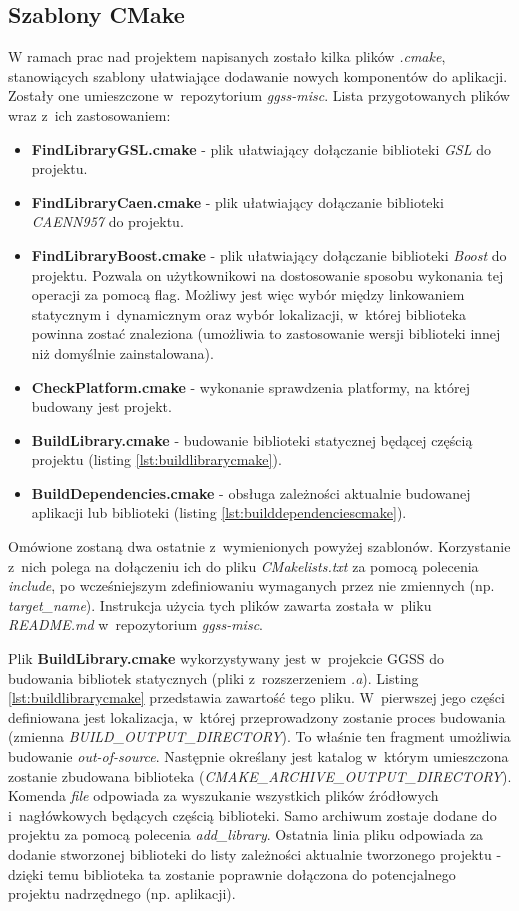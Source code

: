 \subsection{Szablony CMake}
W ramach prac nad projektem napisanych zostało kilka plików \textit{.cmake}, stanowiących szablony ułatwiające dodawanie nowych komponentów do aplikacji. Zostały one umieszczone w~repozytorium \textit{ggss-misc}. Lista przygotowanych plików wraz z~ich zastosowaniem:
\begin{itemize}
\item \textbf{FindLibraryGSL.cmake} - plik ułatwiający dołączanie biblioteki \textit{GSL} do projektu.
\item \textbf{FindLibraryCaen.cmake} - plik ułatwiający dołączanie biblioteki \textit{CAENN957} do projektu.
\item \textbf{FindLibraryBoost.cmake} -  plik ułatwiający dołączanie biblioteki \textit{Boost} do projektu. Pozwala on użytkownikowi na dostosowanie sposobu wykonania tej operacji za pomocą flag. Możliwy jest więc wybór między linkowaniem statycznym i~dynamicznym oraz wybór lokalizacji, w~której biblioteka powinna zostać znaleziona (umożliwia to zastosowanie wersji biblioteki innej niż domyślnie zainstalowana). 
\item \textbf{CheckPlatform.cmake} - wykonanie sprawdzenia platformy, na której budowany jest projekt.
\item \textbf{BuildLibrary.cmake} - budowanie biblioteki statycznej będącej częścią projektu (listing \ref{lst:buildlibrarycmake}).
\item \textbf{BuildDependencies.cmake} - obsługa zależności aktualnie budowanej aplikacji lub biblioteki (listing \ref{lst:builddependenciescmake}). 
\end{itemize}

Omówione zostaną dwa ostatnie z~wymienionych powyżej szablonów. Korzystanie z~nich polega na dołączeniu ich do pliku \textit{CMakelists.txt} za pomocą polecenia \textit{include}, po wcześniejszym zdefiniowaniu wymaganych przez nie zmiennych (np. \textit{target\_name}). Instrukcja użycia tych plików zawarta została w~pliku \textit{README.md} w~repozytorium \textit{ggss-misc}.

Plik \textbf{BuildLibrary.cmake} wykorzystywany jest w~projekcie GGSS do budowania bibliotek statycznych (pliki z~rozszerzeniem \textit{.a}). Listing \ref{lst:buildlibrarycmake} przedstawia zawartość tego pliku. W~pierwszej jego części definiowana jest lokalizacja, w~której przeprowadzony zostanie proces budowania (zmienna \textit{BUILD\_OUTPUT\_DIRECTORY}). To właśnie ten fragment umożliwia budowanie \textit{out-of-source}. Następnie określany jest katalog w~którym umieszczona zostanie zbudowana biblioteka (\textit{CMAKE\_ARCHIVE\_OUTPUT\_DIRECTORY}). Komenda \textit{file} odpowiada za wyszukanie wszystkich plików źródłowych i~nagłówkowych będących częścią biblioteki. Samo archiwum zostaje dodane do projektu za pomocą polecenia \textit{add\_library}. Ostatnia linia pliku odpowiada za dodanie stworzonej biblioteki do listy zależności aktualnie tworzonego projektu - dzięki temu biblioteka ta zostanie poprawnie dołączona do potencjalnego projektu nadrzędnego (np. aplikacji).


